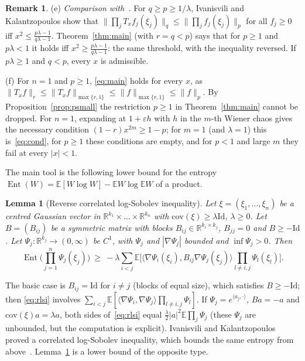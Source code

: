 \documentclass[11pt]{amsart}
\newtheorem{lemma}[theorem]{Lemma}
\theoremstyle{definition}
\newtheorem{remark}[theorem]{Remark}
\newcommand{\E}{\mathbb{E}}
\newcommand{\R}{\mathbb{R}}
\newcommand{\Ent}{\operatorname{Ent}}
\newcommand{\Id}{\mathrm{Id}}
\begin{document}
\begin{remark}
(e) \emph{Comparison with~\cite[Thm.~10]{IK25}.} For $q\ge p\ge1/\lambda$, Ivanisvili and Kalantzopoulos show
that $\|\prod_jT_xf_j(\xi_j)\|_q\le\|\prod_jf_j(\xi_j)\|_p$ for all $f_j\ge0$ iff
$x^2\le\frac{p\lambda-1}{q\lambda-1}$. Theorem~\ref{thm:main} (with $r=q<p$) says that for $p\ge1$ and $p\lambda<1$
it holds iff $x^2\ge\frac{p\lambda-1}{q\lambda-1}$: the same threshold, with the inequality reversed. If $p\lambda\ge1$
and $q<p$, every $x$ is admissible.

(f) For $n=1$ and $p\ge1$, \eqref{eq:main} holds for every $x$, as $\|T_xf\|_r\le\|T_xf\|_{\max\{r,1\}}\le
\|f\|_{\max\{r,1\}}\le\|f\|_p$. By Proposition~\ref{prop:psmall} the restriction $p\ge1$ in Theorem~\ref{thm:main}
cannot be dropped. For $n=1$, expanding at $1+\varepsilon h$ with $h$ in the $m$-th Wiener chaos gives the necessary
condition $(1-r)x^{2m}\ge1-p$; for $m=1$ (and $\lambda=1$) this is~\eqref{eq:cond}, for $p\ge1$ these conditions are
empty, and for $p<1$ and large $m$ they fail at every $|x|<1$.
\end{remark}

The main tool is the following lower bound for the entropy $\Ent(W)=\E[W\log W]-\E W\log\E W$ of a product.

\begin{lemma}[Reverse correlated log-Sobolev inequality]\label{lem:rlsi}
Let $\xi=(\xi_1,\dots,\xi_n)$ be a centred Gaussian vector in $\R^{k_1}\times\dots\times\R^{k_n}$ with
$\mathrm{cov}(\xi)\ge\lambda\Id$, $\lambda\ge0$. Let $B=(B_{ij})$ be a symmetric matrix with blocks
$B_{ij}\in\R^{k_i\times k_j}$, $B_{jj}=0$ and $B\ge-\Id$. Let $\Psi_j:\R^{k_j}\to(0,\infty)$ be $C^1$, with $\Psi_j$ and
$|\nabla\Psi_j|$ bounded and $\inf\Psi_j>0$. Then
\begin{equation}\label{eq:rlsi}
\Ent\Big(\prod_{j=1}^n\Psi_j(\xi_j)\Big)\ \ge\ -\lambda\sum_{i<j}
\E\Big[\langle\nabla\Psi_i(\xi_i),B_{ij}\nabla\Psi_j(\xi_j)\rangle\prod_{l\ne i,j}\Psi_l(\xi_l)\Big].
\end{equation}
\end{lemma}

The basic case is $B_{ij}=\Id$ for $i\ne j$ (blocks of equal size), which satisfies $B\ge-\Id$; then
\eqref{eq:rlsi} involves $\sum_{i<j}\E[\langle\nabla\Psi_i,\nabla\Psi_j\rangle\prod_{l\ne i,j}\Psi_l]$. If
$\Psi_j=e^{\langle a_j,\cdot\rangle}$, $Ba=-a$ and $\mathrm{cov}(\xi)a=\lambda a$, both sides of~\eqref{eq:rlsi} equal
$\frac\lambda2|a|^2\E\prod_j\Psi_j$ (these $\Psi_j$ are unbounded, but the computation is explicit). Ivanisvili and
Kalantzopoulos proved a correlated log-Sobolev inequality, which bounds the same entropy from
above~\cite[Thm.~11]{IK25}. Lemma~\ref{lem:rlsi} is a lower bound of the opposite type.
\end{document}
